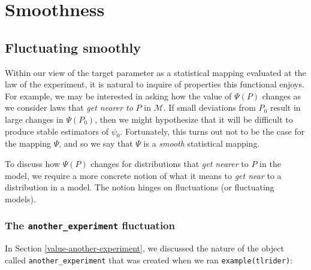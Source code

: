 \documentclass[
  11pt,
  openright,twoside]{book}
\newcommand{\calM}{\mathcal{M}}
\theoremstyle{definition}
\theoremstyle{definition}
\theoremstyle{definition}
\theoremstyle{definition}
\theoremstyle{remark}
\begin{document}
\hypertarget{smooth}{%
\chapter{Smoothness}\label{smooth}}

\hypertarget{smooth-first-pass}{%
\section{Fluctuating smoothly}\label{smooth-first-pass}}

Within our view of the target parameter as a statistical mapping evaluated at
the law of the experiment, it is natural to inquire of properties this
functional enjoys. For example, we may be interested in asking how the value
of \(\Psi(P)\) changes as we consider laws that \emph{get nearer to} \(P\) in \(\calM\).
If small deviations from \(P_0\) result in large changes in \(\Psi(P_0)\), then we
might hypothesize that it will be difficult to produce stable estimators of
\(\psi_0\). Fortunately, this turns out not to be the case for the mapping
\(\Psi\), and so we say that \(\Psi\) is a \emph{smooth} statistical mapping.

To discuss how \(\Psi(P)\) changes for distributions that \emph{get nearer} to \(P\) in
the model, we require a more concrete notion of what it means to \emph{get near} to
a distribution in a model. The notion
hinges on fluctuations (or fluctuating models).

\hypertarget{fluctuations}{%
\subsection{\texorpdfstring{The \texttt{another\_experiment} fluctuation}{The another\_experiment fluctuation}}\label{fluctuations}}

In Section \ref{value-another-experiment}, we discussed the nature of the
object called \texttt{another\_experiment} that was created when we ran
\texttt{example(tlrider)}:
\end{document}

